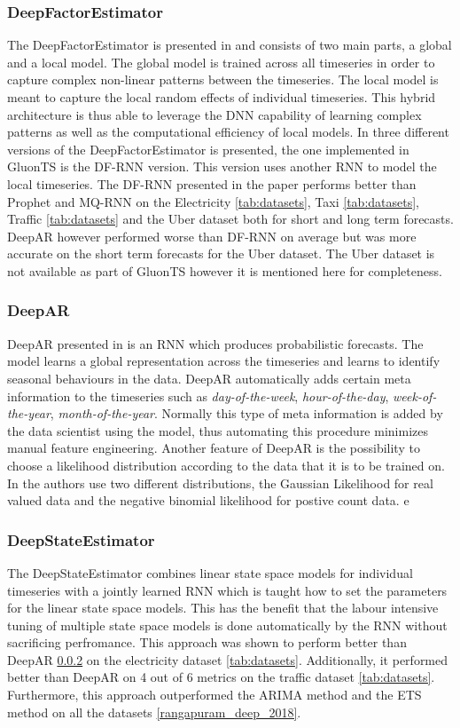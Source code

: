\subsubsection{DeepFactorEstimator}
The DeepFactorEstimator is presented in \cite{wang_deep_2019} and consists of two main parts, a global and a local model. The global model is trained across all timeseries in order to capture complex non-linear patterns between the timeseries. The local model is meant to capture the local random effects of individual timeseries. This hybrid architecture is thus able to leverage the DNN capability of learning complex patterns as well as the computational efficiency of local models. In \cite{wang_deep_2019} three different versions of the DeepFactorEstimator is presented, the one implemented in GluonTS is the DF-RNN version. This version uses another RNN to model the local timeseries. The DF-RNN presented in the paper performs better than Prophet and MQ-RNN on the Electricity \ref{tab:datasets}, Taxi \ref{tab:datasets}, Traffic \ref{tab:datasets} and the Uber dataset both for short and long term forecasts. DeepAR however performed worse than DF-RNN on average but was more accurate on the short term forecasts for the Uber dataset. The Uber dataset is not available as part of GluonTS however it is mentioned here for completeness.

\subsubsection{DeepAR}  
\label{algo:deepar}
DeepAR presented in \cite{salinas_deepar_2019} is an RNN which produces probabilistic forecasts. The model learns a global representation across the timeseries and learns to identify seasonal behaviours in the data. DeepAR automatically adds certain meta information to the timeseries such as \textit{day-of-the-week}, \textit{hour-of-the-day}, \textit{week-of-the-year}, \textit{month-of-the-year}. Normally this type of meta information is added by the data scientist using the model, thus automating this procedure minimizes manual feature engineering. Another feature of DeepAR is the possibility to choose a likelihood distribution according to the data that it is to be trained on. In \cite{salinas_deepar_2019} the authors use two different distributions, the Gaussian Likelihood for real valued data and the negative binomial likelihood for postive count data. 
e
\subsubsection{DeepStateEstimator}
The DeepStateEstimator combines linear state space models for individual timeseries with a jointly learned RNN which is taught how to set the parameters for the linear state space models. This has the benefit that the labour intensive tuning of multiple state space models is done automatically by the RNN without sacrificing perfromance. This approach was shown to perform better than DeepAR \ref{algo:deepar} on the electricity dataset \ref{tab:datasets}. Additionally, it performed better than DeepAR on 4 out of 6 metrics on the traffic dataset \ref{tab:datasets}. Furthermore, this approach outperformed the ARIMA method and the ETS method on all the datasets \ref{rangapuram_deep_2018}. 


